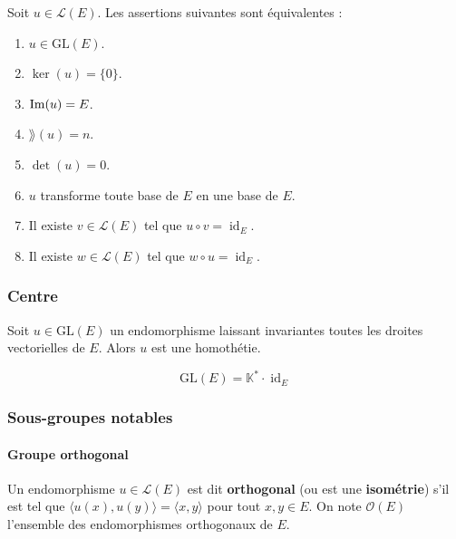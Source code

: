   \begin{theorem}
    Soit $u \in \mathcal{L}(E)$. Les assertions suivantes sont équivalentes :
    \begin{enumerate}[label={\bfseries(\roman*)}]
      \item $u \in \mathrm{GL}(E)$.
      \item $\ker(u) = \{ 0 \}$.
      \item $\mathrm{Im}(u) = E$.
      \item $\rang(u) = n$.
      \item $\det(u) = 0$.
      \item $u$ transforme toute base de $E$ en une base de $E$.
      \item Il existe $v \in \mathcal{L}(E)$ tel que $u \circ v = \operatorname{id}_E$.
      \item Il existe $w \in \mathcal{L}(E)$ tel que $w \circ u = \operatorname{id}_E$.
    \end{enumerate}
  \end{theorem}

  \subsubsection{Centre}


  \begin{proposition}
    Soit $u \in \mathrm{GL}(E)$ un endomorphisme laissant invariantes toutes les droites vectorielles de $E$. Alors $u$ est une homothétie.
  \end{proposition}

  \begin{theorem}
    \[ \mathrm{GL}(E) = \mathbb{K}^* \cdot \operatorname{id}_E \]
  \end{theorem}

  \subsubsection{Sous-groupes notables}

  \paragraph{Groupe orthogonal}


  \begin{definition}
    Un endomorphisme $u \in \mathcal{L}(E)$ est dit \textbf{orthogonal} (ou est une \textbf{isométrie}) s'il est tel que $\langle u(x), u(y) \rangle = \langle x, y \rangle$ pour tout $x, y \in E$. On note $\mathcal{O}(E)$ l'ensemble des endomorphismes orthogonaux de $E$.
  \end{definition}

